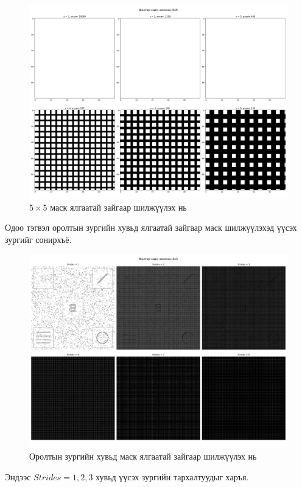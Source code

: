 \documentclass[a4paper]{article}
\begin{document}
\begin{figure}[H]
  \centering
  \includegraphics[scale = 0.30]{mask_stride_size.png}
  \caption[Intensity 1]{$5\times5$ маск ялгаатай зайгаар шилжүүлэх нь}
\end{figure}
Одоо тэгвэл оролтын зургийн хувьд ялгаатай зайгаар маск шилжүүлэхэд үүсэх зургийг сонирхъё.
\begin{figure}[H]
  \centering
  \includegraphics[scale = 0.30]{mask_3_strides.png}
  \caption[Intensity 1]{Оролтын зургийн хувьд маск ялгаатай зайгаар шилжүүлэх нь}
\end{figure}
Эндээс $Strides = 1, 2, 3$ хувьд үүсэх зургийн тархалтуудыг харъя.
\end{document}

